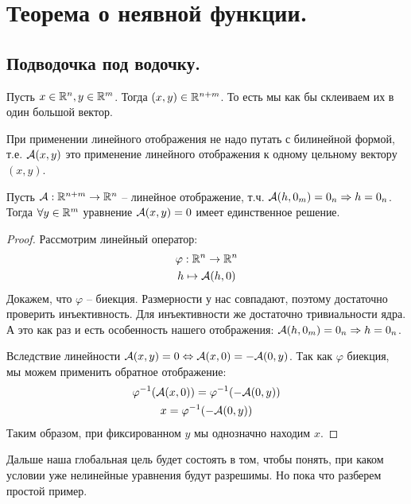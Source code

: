 \section{Теорема о неявной функции.}
\subsection*{Подводочка под водочку.}
\begin{conj}
    Пусть $x \in \mathbb{R}^n, y \in \mathbb{R}^m$. 
    Тогда $(x, y) \in \mathbb{R}^{n + m}$.  
    То есть мы как бы склеиваем их в один большой вектор.
\end{conj}

\begin{notice}
    При применении линейного отображения не надо путать с билинейной формой, т.е. $\mathcal{A}(x, y)$ это применение линейного отображения к одному цельному вектору $(x, y)$.
\end{notice}

\begin{lemma}
    Пусть $\mathcal{A} : \mathbb{R}^{n + m} \to \mathbb{R}^n$ -- линейное отображение, т.ч. $\mathcal{A}(h, 0_m) = 0_n \Rightarrow h = 0_n$.
    \\ Тогда $\forall y \in \mathbb{R}^m$ уравнение $\mathcal{A}(x, y) = 0$ имеет единственное решение.
\end{lemma}
\begin{proof}
    Рассмотрим линейный оператор: \begin{gather*}
        \varphi: \mathbb{R}^n \to \mathbb{R}^n \\
        h \mapsto \mathcal{A}(h, 0)
    \end{gather*}
    \quad Докажем, что $\varphi$ -- биекция.
    Размерности у нас совпадают, поэтому достаточно проверить инъективность.
    Для инъективности же достаточно тривиальности ядра. 
    А это как раз и есть особенность нашего отображения: $\mathcal{A}(h, 0_m) = 0_n \Rightarrow h = 0_n$.

    \quad Вследствие линейности $\mathcal{A}(x, y) = 0 \Leftrightarrow \mathcal{A}(x, 0) = -\mathcal{A}(0, y)$.
    Так как $\varphi$ биекция, мы можем применить обратное отображение:
    \begin{gather*} 
        \varphi^{-1}(\mathcal{A}(x, 0)) = \varphi^{-1}(-\mathcal{A}(0, y)) \\
        x = \varphi^{-1}(-\mathcal{A}(0, y))
    \end{gather*}
    \quad Таким образом, при фиксированном $y$ мы однозначно находим $x$.
\end{proof}

Дальше наша глобальная цель будет состоять в том, чтобы понять, при каком условии уже нелинейные уравнения будут разрешимы.
Но пока что разберем простой пример.

